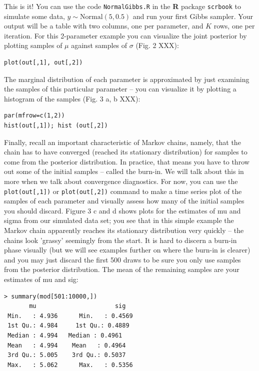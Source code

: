 This is it! You can use the code \mbox{\tt NormalGibbs.R} in the {\bf
  R} package \mbox{\tt scrbook}
to simulate some data, $y \sim \mbox{Normal}(5, 0.5)$ and run your first
Gibbs sampler. Your output will be a table with two columns, one per
parameter, and $K$ rows, one per iteration. For this 2-parameter example
you can visualize the joint posterior by plotting samples of $\mu$
against samples of $\sigma$ (Fig. 2 XXX):
\begin{verbatim}
plot(out[,1], out[,2])
\end{verbatim}
The marginal distribution of each parameter is approximated by just
examining the samples of this particular parameter – you can visualize
it by plotting a histogram of the samples (Fig. 3 a, b XXX):
\begin{verbatim}
par(mfrow=c(1,2))
hist(out[,1]); hist (out[,2])
\end{verbatim}

Finally, recall an important characteristic of Markov chains, namely,
that the chain has to have converged (reached its stationary
distribution) for samples to come from the posterior distribution. In
practice, that means you have to throw out some of the initial samples
– called the burn-in. We will talk about this in more when we talk
about convergence diagnostics. For now, you can use the
\verb#plot(out[,1])# or \verb#plot(out[,2])# command to make a time
series plot of the samples of each parameter and visually assess how
many of the initial samples you should discard. Figure 3 c and d shows
plots for the estimates of mu and sigma from our simulated data set;
you see that in this simple example the Markov chain apparently
reaches its stationary distribution very quickly – the chains look
'grassy' seemingly from the start. It is hard to discern a burn-in
phase visually (but we will see examples further on where the burn-in
is clearer) and you may just discard the first 500 draws to be sure
you only use samples from the posterior distribution. The mean of the
remaining samples are your estimates of mu and sig: 
\begin{verbatim}
> summary(mod[501:10000,])
       mu                      sig        
 Min.   : 4.936      Min.   : 0.4569  
 1st Qu.: 4.984     1st Qu.: 0.4889  
 Median : 4.994   Median : 0.4961  
 Mean   : 4.994    Mean   : 0.4964  
 3rd Qu.: 5.005    3rd Qu.: 0.5037  
 Max.   : 5.062      Max.   : 0.5356  
\end{verbatim}

